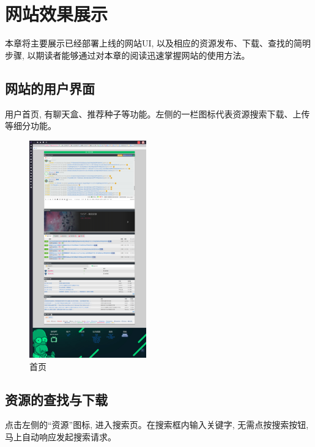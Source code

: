 \chapter{网站效果展示}

本章将主要展示已经部署上线的网站UI, 以及相应的资源发布、下载、查找的简明步骤, 以期读者能够通过对本章的阅读迅速掌握网站的使用方法。

\section{网站的用户界面}

用户首页, 有聊天盒、推荐种子等功能。左侧的一栏图标代表资源搜索下载、上传等细分功能。

\begin{figure}[h]
    \centering
    \includegraphics[width=0.45\textwidth]{support-files/5.1-index-ui.png}
    \caption{首页}
    \label{fig:webindex}
\end{figure}

\section{资源的查找与下载}

点击左侧的``资源''图标, 进入搜索页。在搜索框内输入关键字, 无需点按搜索按钮, 马上自动响应发起搜索请求。

